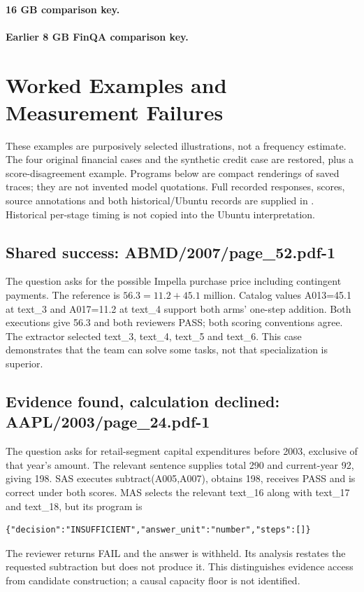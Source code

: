 \paragraph{16 GB comparison key.}



\paragraph{Earlier 8 GB FinQA comparison key.}




\section{Worked Examples and Measurement Failures}\label{sec:examples}
These examples are purposively selected illustrations, not a frequency estimate. The four original financial cases and the synthetic credit case are restored, plus a score-disagreement example. Programs below are compact renderings of saved traces; they are not invented model quotations. Full recorded responses, scores, source annotations and both historical/Ubuntu records are supplied in . Historical per-stage timing is not copied into the Ubuntu interpretation.

\subsection{Shared success: ABMD/2007/page\_52.pdf-1}
The question asks for the possible Impella purchase price including contingent payments. The reference is $56.3=11.2+45.1$ million. Catalog values A013=45.1 at text\_3 and A017=11.2 at text\_4 support both arms' one-step addition. Both executions give 56.3 and both reviewers PASS; both scoring conventions agree. The extractor selected text\_3, text\_4, text\_5 and text\_6. This case demonstrates that the team can solve some tasks, not that specialization is superior.

\subsection{Evidence found, calculation declined: AAPL/2003/page\_24.pdf-1}
The question asks for retail-segment capital expenditures before 2003, exclusive of that year's amount. The relevant sentence supplies total 290 and current-year 92, giving 198. SAS executes subtract(A005,A007), obtains 198, receives PASS and is correct under both scores. MAS selects the relevant text\_16 along with text\_17 and text\_18, but its program is
\begin{verbatim}
{"decision":"INSUFFICIENT","answer_unit":"number","steps":[]}
\end{verbatim}
The reviewer returns FAIL and the answer is withheld. Its analysis restates the requested subtraction but does not produce it. This distinguishes evidence access from candidate construction; a causal capacity floor is not identified.

